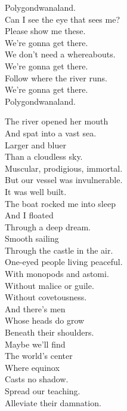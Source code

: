 Polygondwanaland. \\
Can I see the eye that sees me? \\
Please show me these. \\

We're gonna get there. \\
We don't need a whereabouts. \\
We're gonna get there. \\
Follow where the river runs. \\
We're gonna get there. \\
Polygondwanaland. \\




The river opened her mouth \\
And spat into a vast sea. \\
Larger and bluer \\
Than a cloudless sky. \\
Muscular, prodigious, immortal. \\
But our vessel was invulnerable. \\
It was well built. \\
The boat rocked me into sleep \\
And I floated \\
Through a deep dream. \\
Smooth sailing \\
Through the castle in the air. \\

One-eyed people living peaceful. \\
With monopods and astomi. \\
Without malice or guile. \\
Without covetousness. \\

And there's men \\
Whose heads do grow \\
Beneath their shoulders. \\
Maybe we'll find \\
The world's center \\
Where equinox \\
Casts no shadow. \\
Spread our teaching. \\
Alleviate their damnation. \\


